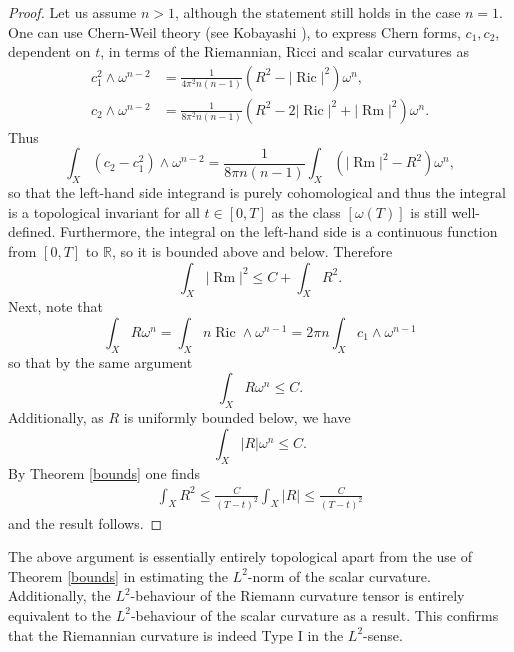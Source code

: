 \documentclass[12pt]{article}
\numberwithin{equation}{section}
\newcommand{\R}{\mathbb{R}}
\DeclareMathOperator{\Ric}{Ric}
\DeclareMathOperator{\Rm}{Rm}
\begin{document}
\begin{proof}
Let us assume $n > 1$, although the statement still holds in the case $n = 1$. One can use Chern-Weil theory (see Kobayashi \cite[\S 4.4]{K14}), to express Chern forms, $c_1, c_2$, dependent on $t$, in terms of the Riemannian, Ricci and scalar curvatures as
\begin{align*}
    c^2_1 \wedge \omega^{n-2} &= \frac{1}{4\pi^2 n(n-1)} (R^2 - |\Ric|^2) \omega^n,\\
    c_2 \wedge \omega^{n-2} &= \frac{1}{8\pi^2 n(n-1)} (R^2 - 2|\Ric|^2 + |\Rm|^2) \omega^n.
\end{align*}
Thus
\begin{equation*}
    \int_X (c_2-c_1^2) \wedge \omega^{n-2} = \frac{1}{8\pi n(n-1)} \int_X (|\Rm|^2-R^2)\omega^n,
\end{equation*}
so that the left-hand side integrand is purely cohomological and thus the integral is a topological invariant for all $t\in [0,T]$ as the class $[\omega(T)]$ is still well-defined. Furthermore, the integral on the left-hand side is a continuous function from $[0,T]$ to $\R$, so it is bounded above and below. Therefore
\begin{equation*}
    \int_X |\Rm|^2 \leq C+\int_X R^2.
\end{equation*}
Next, note that
\begin{equation*}
    \int_X R \omega^n = \int_X n \Ric \wedge \omega^{n-1} = 2 \pi n\int_X c_1 \wedge \omega^{n-1}
\end{equation*}
so that by the same argument
\begin{equation*}
    \int_X R \omega^n \leq C.
\end{equation*}
Additionally, as $R$ is uniformly bounded below, we have
\begin{equation*}
    \int_X |R| \omega^n \leq C.
\end{equation*}
By Theorem \ref{bounds} one finds
\begin{align*}
    \int_X R^2 \leq \frac{C}{(T-t)^2} \int_X |R|\leq \frac{C}{(T-t)^2}
\end{align*}
and the result follows.
\end{proof}

\noindent 
The above argument is essentially entirely topological apart from the use of Theorem \ref{bounds} in estimating the $L^2$-norm of the scalar curvature. Additionally, the $L^2$-behaviour of the Riemann curvature tensor is entirely equivalent to the $L^2$-behaviour of the scalar curvature as a result. This confirms that the Riemannian curvature is indeed Type I in the $L^2$-sense.\\
\end{document}
